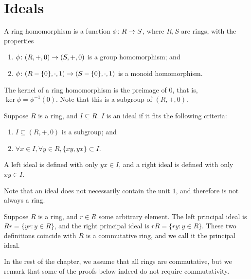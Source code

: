 \section{Ideals}

\begin{definition}
    A ring homomorphism is a function \(\phi\colon R\to S\),
    where \(R,S\) are rings,
    with the properties
    \begin{enumerate}[label={(\roman*)}, itemsep=0mm]
        \item \(\phi\colon(R,+,0)\to(S,+,0)\) is a group homomorphism; and
        \item \(\phi\colon(R - \{0\},\cdot,1)\to(S - \{0\},\cdot,1)\)
            is a monoid homomorphism.
    \end{enumerate}
\end{definition}
\begin{definition}
    The kernel of a ring homomorphism
    is the preimage of \(0\),
    that is, \(\ker\phi = \phi^{-1}(0)\).
    Note that this is a subgroup of \((R,+,0)\).
\end{definition}

\begin{definition}
    Suppose \(R\) is a ring, and \(I \subseteq R\).
    \(I\) is an ideal if it fits the following criteria:
    \begin{enumerate}[label={(\roman*)}, itemsep=0mm]
        \item \(I \subseteq (R,+,0)\) is a subgroup; and
        \item \(\forall x \in I, \forall y \in R, \{xy,yx\} \subset I\).
    \end{enumerate}
    A left ideal is defined with only \(yx \in I\),
    and a right ideal is defined with only \(xy \in I\).
\end{definition}
\begin{remark}
    Note that an ideal does not necessarily contain the unit \(1\),
    and therefore is not always a ring.
\end{remark}

\begin{definition}
    Suppose \(R\) is a ring, and \(r \in R\) some arbitrary element.
    The left principal ideal is \(Rr = \{yr : y \in R\}\),
    and the right principal ideal is \(rR = \{ry : y \in R\}\).
    These two definitions coincide with \(R\) is a commutative ring,
    and we call it the principal ideal.
\end{definition}
\begin{remark}
    In the rest of the chapter, we assume that all rings are commutative,
    but we remark that some of the proofs below indeed do not require commutativity.
\end{remark}

